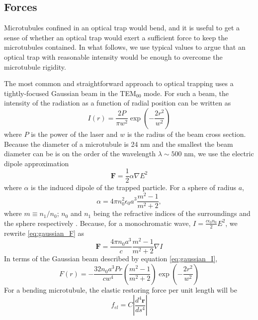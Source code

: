 \documentclass[11pt]{ucthesis}
\begin{document}
\subsection{Forces}

Microtubules confined in an optical trap would bend, and it is useful to get a sense of whether an optical trap would exert a sufficient force to keep the microtubules contained. In what follows, we use typical values to argue that an optical trap with reasonable intensity would be enough to overcome the microtubule rigidity.

The most common and straightforward approach to optical trapping uses a tightly-focused Gaussian beam in the TEM$_{00}$ mode. For such a beam, the intensity of the radiation as a function of radial position can be written as
\begin{equation}
\label{eq:gaussian_I}
I(r) = \frac{2P}{\pi w^2} \exp\left(-\frac{2r^2}{w^2}\right)
\end{equation}
where $P$ is the power of the laser and $w$ is the radius of the beam cross section. Because the diameter of a microtubule is 24 nm and the smallest the beam diameter can be is on the order of the wavelength $\lambda \sim 500$ nm, we use the electric dipole approximation
\begin{equation}
\label{eq:gaussian_F}
\mathbf{F} = \frac12\alpha \nabla E^2
\end{equation}
where $\alpha$ is the induced dipole of the trapped particle. For a sphere of radius $a$,
\begin{equation}
\label{eq:alpha}
\alpha = 4\pi n_0^2 \epsilon_0 a^3\frac{m^2-1}{m^2+2},
\end{equation}
where $m\equiv n_1/n_0$; $n_0$ and $n_1$ being the refractive indices of the surroundings and the sphere respectively \cite{harada1996radiation}. Because, for a monochromatic wave, $I = \frac{c\epsilon_0 n_0}{2}E^2$, we rewrite \ref{eq:gaussian_F} as
\begin{equation}
\label{eq:FwithI}
\mathbf{F} = \frac{4\pi n_0 a^3}{c}\frac{m^2-1}{m^2+2} \nabla I
\end{equation} 
In terms of the Gaussian beam described by equation \ref{eq:gaussian_I},
\begin{equation}
\label{eq:Fofr}
F(r) = -\frac{32 n_0 a^3 P r}{c w^4}\left(\frac{m^2-1}{m^2+2}\right)\exp\left(-\frac{2r^2}{w^2}\right) 
\end{equation}
For a bending microtubule, the elastic restoring force per unit length will be
\begin{equation}
\label{eq:fel}
f_{el} = C\left|\frac{d^4\mathbf{r}}{ds^4}\right|
\end{equation}
\end{document}
